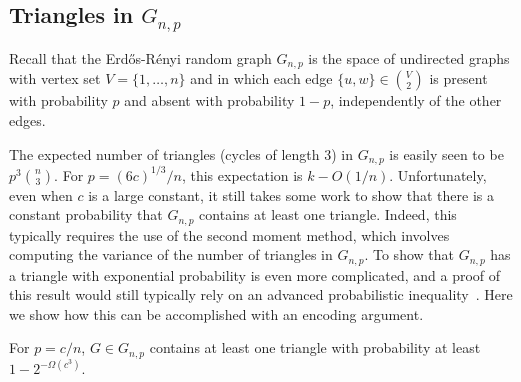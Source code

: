 \documentclass{patmorin}
\begin{document}
\subsection{Triangles in $G_{n,p}$}

Recall that the Erd\H{o}s-R\'{e}nyi random graph $G_{n,p}$ is the
space of undirected graphs with vertex set $V=\{1,\ldots,n\}$ and in
which each edge $\{u, w\} \in \binom{V}{2}$ is present with
probability $p$ and absent with probability $1-p$, independently of
the other edges.

The expected number of triangles (cycles of length 3) in $G_{n,p}$ is
easily seen to be $p^3\binom{n}{3}$.  For $p=(6c)^{1/3}/n$, this
expectation is $k-O(1/n)$.  Unfortunately, even when $c$ is a large
constant, it still takes some work to show that there is a constant
probability that $G_{n,p}$ contains at least one triangle. Indeed,
this typically requires the use of the second moment method, which
involves computing the variance of the number of triangles in
$G_{n,p}$. To show that $G_{n, p}$ has a triangle with exponential
probability is even more complicated, and a proof of this result would
still typically rely on an advanced probabilistic
inequality~\cite{alon:probabilistic}. Here we show how this can be
accomplished with an encoding argument.

\begin{thm}
  For $p=c/n$, $G \in G_{n,p}$ contains at least one triangle with
  probability at least $1-2^{-\Omega(c^3)}$.
\end{thm}
\end{document}
